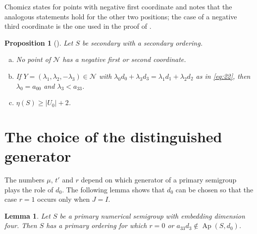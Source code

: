 \documentclass{amsart}
\newtheorem{proposition}[theorem]{Proposition}
\newtheorem{lemma}[theorem]{Lemma}
\theoremstyle{definition}
\theoremstyle{remark}
\numberwithin{equation}{section}
\newcommand{\Ap}{\operatorname{Ap}}
\newcommand{\Apd}{\Ap(S,d_0)}
\begin{document}
Chomicz states \cite[Lemma~3.8]{Cho26} for points with negative first coordinate and notes that the analogous statements hold for the other two positions; the case of a negative third coordinate is the one used in the proof of \cite[Lemma~4.11]{Cho26}.

\begin{proposition}[{\cite[Lemmas~3.12, 3.14, 3.15 and 4.16]{Cho26}}]\label{prop:N-secondary}
Let $S$ be secondary with a secondary ordering.
\begin{enumerate}[(a)]
\item No point of $\mathcal N$ has a negative first or second coordinate.
\item If $Y=(\lambda_1,\lambda_2,-\lambda_3)\in\mathcal N$ with $\lambda_0d_0+\lambda_3d_3=\lambda_1d_1+\lambda_2d_2$ as in \eqref{eq:22}, then $\lambda_0=a_{00}$ and $\lambda_3<a_{33}$.
\item $\eta(S)\ge|U_0|+2$.
\end{enumerate}
\end{proposition}

\section{The choice of the distinguished generator}\label{sec:choice}

The numbers $\mu$, $t'$ and $r$ depend on which generator of a primary semigroup plays the role of $d_0$. The following lemma shows that $d_0$ can be chosen so that the case $r=1$ occurs only when $J=I$.

\begin{lemma}\label{lem:choice}
Let $S$ be a primary numerical semigroup with embedding dimension four. Then $S$ has a primary ordering for which $r=0$ or $a_{33}d_3\notin\Apd$.
\end{lemma}
\end{document}
